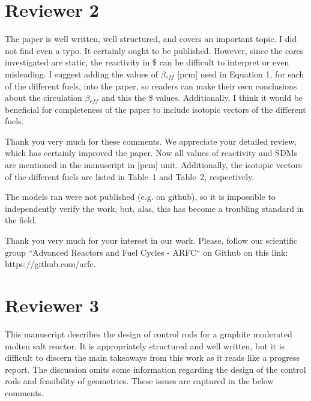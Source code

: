 \documentclass[answers,11pt]{exam}
\begin{document}
\begin{questions}
        \section*{Reviewer 2}

        \question The paper is well written, well structured, and covers an important topic. I did not find even a typo. It certainly ought to be published. However, since the cores investigated are static, the reactivity in \$ can be difficult to interpret or even misleading. I suggest adding the values of $\beta$$_{eff}$ [pcm] used in Equation 1, for each of the different fuels, into the paper, so readers can make their own conclusions about the circulation $\beta$$_{eff}$ and this the \$ values. Additionally, I think it would be beneficial for completeness of the paper to include isotopic vectors of the different fuels.
        
        \begin{solution}
        Thank you very much for these comments. We appreciate your detailed review, which has certainly improved the paper. Now all values of reactivity and SDMs are mentioned in the manuscript in [pcm] unit. Additionally, the isotopic vectors of the different fuels are listed in Table~1 and Table~2, respectively.
        
        \end{solution}


        \question The models ran were not published (e.g. on github), so it is impossible to independently verify the work, but, alas, this has become a troubling standard in the field.
        
        \begin{solution}
                 Thank you very much for your interest in our work. Please, follow our scientific group ``Advanced Reactors and Fuel Cycles -
                 ARFC`` on Github on this link: https://github.com/arfc.   

                 
        \end{solution}

      
\section*{Reviewer 3}
        \question This manuscript describes the design of control rods for a graphite moderated molten salt reactor. It is appropriately structured and well written, but it is difficult to discern the main takeaways from this work as it reads like a progress report. The discussion omits some information regarding the design of the control rods and feasibility of geometries. These issues are captured in the below comments.
        

\end{questions}
\end{document}
